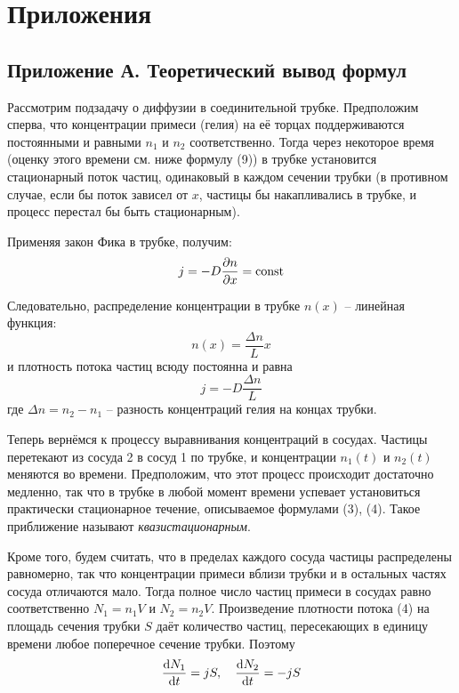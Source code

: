 \chapter{Приложения}
\label{ch:appendix}

\section{Приложение А. Теоретический вывод формул}

Рассмотрим подзадачу о диффузии в соединительной трубке. Предположим сперва, что концентрации примеси (гелия) на её торцах поддерживаются постоянными и равными $n_1$ и $n_2$ соответственно. Тогда через некоторое время (оценку этого времени см. ниже формулу (9)) в трубке установится стационарный поток частиц, одинаковый в каждом сечении трубки (в противном случае, если бы поток зависел от $x$, частицы бы накапливались в трубке, и процесс перестал бы быть стационарным).

Применяя закон Фика в трубке, получим:
\begin{equation}
j = -D \pdv{n}{x} = \text{const}
\end{equation}

Следовательно, распределение концентрации в трубке $n(x)$ -- линейная функция:
\begin{equation}
n(x) = \frac{\Delta n}{L} x
\end{equation}
и плотность потока частиц всюду постоянна и равна
\begin{equation}
j = -D \frac{\Delta n}{L}
\end{equation}
где $\Delta n = n_2 - n_1$ -- разность концентраций гелия на концах трубки.

Теперь вернёмся к процессу выравнивания концентраций в сосудах. Частицы перетекают из сосуда 2 в сосуд 1 по трубке, и концентрации $n_1(t)$ и $n_2(t)$ меняются во времени. Предположим, что этот процесс происходит достаточно медленно, так что в трубке в любой момент времени успевает установиться практически стационарное течение, описываемое формулами (3), (4). Такое приближение называют \emph{квазистационарным}.

Кроме того, будем считать, что в пределах каждого сосуда частицы распределены равномерно, так что концентрации примеси вблизи трубки и в остальных частях сосуда отличаются мало. Тогда полное число частиц примеси в сосудах равно соответственно $N_1 = n_1V$ и $N_2 = n_2V$. Произведение плотности потока (4) на площадь сечения трубки $S$ даёт количество частиц, пересекающих в единицу времени любое поперечное сечение трубки. Поэтому
\begin{equation}
\dv{N_1}{t} = jS, \quad \dv{N_2}{t} = -jS
\end{equation}

